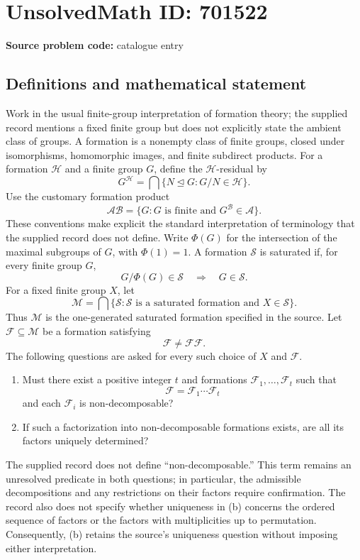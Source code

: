 \documentclass[11pt]{article}
\begin{document}
\section*{UnsolvedMath ID: 701522}
\textbf{Source problem code:} catalogue entry
\subsection{Definitions and mathematical statement}
Work in the usual finite-group interpretation of formation theory; the supplied record mentions a fixed finite group but does not explicitly state the ambient class of groups. A formation is a nonempty class of finite groups, closed under isomorphisms, homomorphic images, and finite subdirect products. For a formation \(\mathcal H\) and a finite group \(G\), define the \(\mathcal H\)-residual by
\[
G^{\mathcal H}=\bigcap\{N\trianglelefteq G:G/N\in\mathcal H\}.
\]
Use the customary formation product
\[
\mathcal A\mathcal B=\{G:G\text{ is finite and }G^{\mathcal B}\in\mathcal A\}.
\]
These conventions make explicit the standard interpretation of terminology that the supplied record does not define. Write \(\Phi(G)\) for the intersection of the maximal subgroups of \(G\), with \(\Phi(1)=1\). A formation \(\mathcal S\) is saturated if, for every finite group \(G\),
\[
G/\Phi(G)\in\mathcal S\quad\Longrightarrow\quad G\in\mathcal S.
\]
For a fixed finite group \(X\), let
\[
\mathcal M=\bigcap\{\mathcal S:\mathcal S\text{ is a saturated formation and }X\in\mathcal S\}.
\]
Thus \(\mathcal M\) is the one-generated saturated formation specified in the source. Let \(\mathcal F\subseteq\mathcal M\) be a formation satisfying
\[
\mathcal F\ne\mathcal F\mathcal F.
\]
The following questions are asked for every such choice of \(X\) and \(\mathcal F\).
\begin{enumerate}
\item[(a)] Must there exist a positive integer \(t\) and formations \(\mathcal F_1,\ldots,\mathcal F_t\) such that
\[
\mathcal F=\mathcal F_1\cdots\mathcal F_t
\]
and each \(\mathcal F_i\) is non-decomposable?
\item[(b)] If such a factorization into non-decomposable formations exists, are all its factors uniquely determined?
\end{enumerate}
The supplied record does not define ``non-decomposable.'' This term remains an unresolved predicate in both questions; in particular, the admissible decompositions and any restrictions on their factors require confirmation. The record also does not specify whether uniqueness in (b) concerns the ordered sequence of factors or the factors with multiplicities up to permutation. Consequently, (b) retains the source's uniqueness question without imposing either interpretation.
\end{document}
